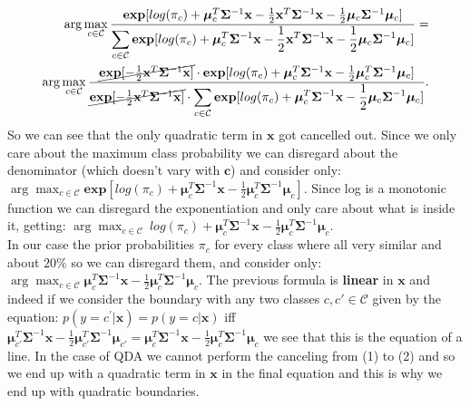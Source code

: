 \documentclass{article}
\begin{document}
\begin{align}
\displaystyle\arg\max_{c\in\mathcal{C}}\frac{\textbf{exp}[log(\pi_c)+\bm{\mu}_c^T\bm{\Sigma}^{-1}\textbf{x}-\frac{1}{2}\textbf{x}^T\bm{\Sigma}^{-1}\textbf{x}-\frac{1}{2}\bm{\mu}_c\bm{\Sigma}^{-1}\bm{\mu}_c]}{\displaystyle\sum_{c\in \mathcal{C}}\textbf{exp}[log(\pi_c)+\bm{\mu}_c^T\bm{\Sigma}^{-1}\textbf{x}-\frac{1}{2}\textbf{x}^T\bm{\Sigma}^{-1}\textbf{x}-\frac{1}{2}\bm{\mu}_c\bm{\Sigma}^{-1}\bm{\mu}_c]}=\\
\displaystyle\arg\max_{c\in\mathcal{C}}\frac{\cancel{\textbf{exp}[-\frac{1}{2}\textbf{x}^T\bm{\Sigma}^{-1}\textbf{x}]}\cdot\textbf{exp}[log(\pi_c)+\bm{\mu}_c^T\bm{\Sigma}^{-1}\textbf{x}-\frac{1}{2}\bm{\mu}^T_c\bm{\Sigma}^{-1}\bm{\mu}_c]}{\cancel{\textbf{exp}[-\frac{1}{2}\textbf{x}^T\bm{\Sigma}^{-1}\textbf{x}]}\cdot\displaystyle\sum_{c\in \mathcal{C}}\textbf{exp}[log(\pi_c)+\bm{\mu}_c^T\bm{\Sigma}^{-1}\textbf{x}-\frac{1}{2}\bm{\mu}_c\bm{\Sigma}^{-1}\bm{\mu}_c]}.
\end{align}
So we can see that the only quadratic term in $\textbf{x}$ got cancelled out. Since we only care about the maximum class probability we can disregard about the denominator (which doesn't vary with $\textbf{c}$) and consider only:\\
$\displaystyle\arg\max_{c\in\mathcal{C}}\textbf{exp}[log(\pi_c)+\bm{\mu}_c^T\bm{\Sigma}^{-1}\textbf{x}-\frac{1}{2}\bm{\mu}^T_c\bm{\Sigma}^{-1}\bm{\mu}_c]$. Since log is a monotonic function we can disregard the exponentiation and only care about what is inside it, getting:
$\displaystyle\arg\max_{c\in\mathcal{C}}\ log(\pi_c)+\bm{\mu}_c^T\bm{\Sigma}^{-1}\textbf{x}-\frac{1}{2}\bm{\mu}^T_c\bm{\Sigma}^{-1}\bm{\mu}_c$.\\
In our case the prior probabilities  $\pi_c$ for every class where all very similar and about $20\%$ so we can disregard them, and consider only:\\
$\displaystyle\arg\max_{c\in\mathcal{C}}\bm{\mu}_c^T\bm{\Sigma}^{-1}\textbf{x}-\frac{1}{2}\bm{\mu}^T_c\bm{\Sigma}^{-1}\bm{\mu}_c$.
The previous formula is \textbf{linear} in $\textbf{x}$ and indeed if we consider the boundary with any two classes $c,c'\in\mathcal{C}$ given by the equation:
$p(y=c^{'}|\textbf{x})=p(y=c|\textbf{x})$ iff $\bm{\mu}_{c'}^T\bm{\Sigma}^{-1}\textbf{x}-\frac{1}{2}\bm{\mu}^T_{c'}\bm{\Sigma}^{-1}\bm{\mu}_{c'}=
\bm{\mu}_c^T\bm{\Sigma}^{-1}\textbf{x}-\frac{1}{2}\bm{\mu}^T_c\bm{\Sigma}^{-1}\bm{\mu}_c$ we see that this is the equation of a line.
In the case of QDA we cannot perform the canceling from (1) to (2) and so we end up with a quadratic term in $\textbf{x}$ in the final equation 
and this is why we end up with quadratic boundaries.
\end{document}
